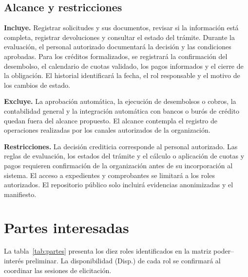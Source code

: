 \documentclass[11pt,a4paper]{article}
\begin{document}
\subsection{Alcance y restricciones}
\textbf{Incluye.} Registrar solicitudes y sus documentos, revisar si la información está completa, registrar devoluciones y consultar el estado del trámite. Durante la evaluación, el personal autorizado documentará la decisión y las condiciones aprobadas. Para los créditos formalizados, se registrará la confirmación del desembolso, el calendario de cuotas validado, los pagos informados y el cierre de la obligación. El historial identificará la fecha, el rol responsable y el motivo de los cambios de estado.

\textbf{Excluye.} La aprobación automática, la ejecución de desembolsos o cobros, la contabilidad general y la integración automática con bancos o burós de crédito quedan fuera del alcance propuesto. El alcance contempla el registro de operaciones realizadas por los canales autorizados de la organización.

\textbf{Restricciones.} La decisión crediticia corresponde al personal autorizado. Las reglas de evaluación, los estados del trámite y el cálculo o aplicación de cuotas y pagos requieren confirmación de la organización antes de su incorporación al sistema. El acceso a expedientes y comprobantes se limitará a los roles autorizados. El repositorio público solo incluirá evidencias anonimizadas y el manifiesto.

\section{Partes interesadas}

La tabla~\ref{tab:partes} presenta los diez roles identificados en la
matriz poder--interés preliminar. La disponibilidad (Disp.) de cada rol se
confirmará al coordinar las sesiones de elicitación.
\end{document}
